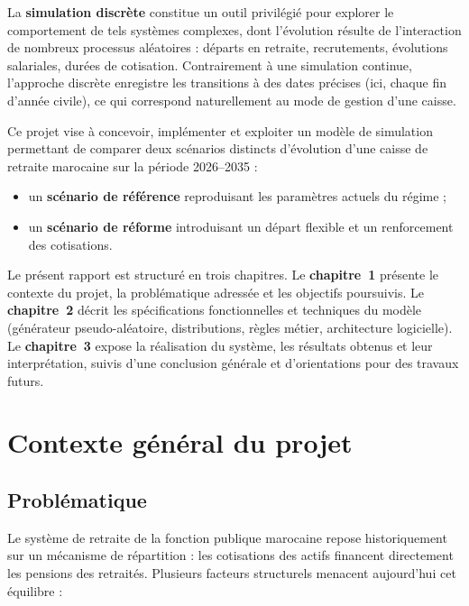 \documentclass[12pt,a4paper,oneside]{report}
\begin{document}
La \textbf{simulation discrète} constitue un outil privilégié pour
explorer le comportement de tels systèmes complexes, dont l'évolution
résulte de l'interaction de nombreux processus aléatoires : départs en
retraite, recrutements, évolutions salariales, durées de cotisation.
Contrairement à une simulation continue, l'approche discrète enregistre
les transitions à des dates précises (ici, chaque fin d'année civile),
ce qui correspond naturellement au mode de gestion d'une caisse.

Ce projet vise à concevoir, implémenter et exploiter un modèle de
simulation permettant de comparer deux scénarios distincts d'évolution
d'une caisse de retraite marocaine sur la période 2026--2035 :
\begin{itemize}
  \item un \textbf{scénario de référence} reproduisant les paramètres
        actuels du régime ;
  \item un \textbf{scénario de réforme} introduisant un départ flexible
        et un renforcement des cotisations.
\end{itemize}

Le présent rapport est structuré en trois chapitres. Le
\textbf{chapitre~1} présente le contexte du projet, la problématique
adressée et les objectifs poursuivis. Le \textbf{chapitre~2} décrit les
spécifications fonctionnelles et techniques du modèle (générateur
pseudo-aléatoire, distributions, règles métier, architecture logicielle).
Le \textbf{chapitre~3} expose la réalisation du système, les résultats
obtenus et leur interprétation, suivis d'une conclusion générale et
d'orientations pour des travaux futurs.

\chapter{Contexte général du projet}

\section{Problématique}

Le système de retraite de la fonction publique marocaine repose
historiquement sur un mécanisme de répartition : les cotisations des
actifs financent directement les pensions des retraités. Plusieurs
facteurs structurels menacent aujourd'hui cet équilibre :
\end{document}
